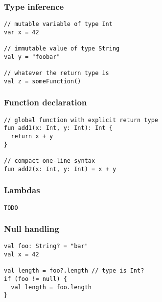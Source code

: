 


\begin{frame}[fragile] \frametitle{Type inference}
\begin{lstlisting}
// mutable variable of type Int
var x = 42

// immutable value of type String
val y = "foobar"

// whatever the return type is
val z = someFunction()
\end{lstlisting}
\end{frame}


\begin{frame}[fragile] \frametitle{Function declaration}
\begin{lstlisting}
// global function with explicit return type
fun add1(x: Int, y: Int): Int {
  return x + y
}

// compact one-line syntax
fun add2(x: Int, y: Int) = x + y
\end{lstlisting}
\end{frame}


\begin{frame}[fragile] \frametitle{Lambdas}
\begin{lstlisting}
TODO
\end{lstlisting}
\end{frame}

\begin{frame}[fragile]
	\frametitle{Null handling}
\begin{lstlisting}
val foo: String? = "bar"
val x = 42

val length = foo?.length // type is Int?
if (foo != null) {
  val length = foo.length
}
\end{lstlisting}
\end{frame}


